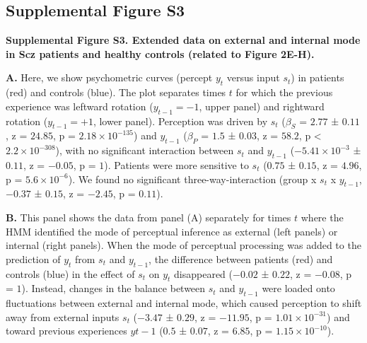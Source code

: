 \documentclass[
]{article}
\begin{document}
\newpage

\hypertarget{supplemental-figure-s3}{%
\subsection{Supplemental Figure S3}\label{supplemental-figure-s3}}


\textbf{Supplemental Figure S3. Extended data on external and internal
mode in Scz patients and healthy controls (related to Figure 2E-H).}

\textbf{A.} Here, we show psychometric curves (percept \(y_t\) versus
input \(s_t\)) in patients (red) and controls (blue). The plot separates
times \(t\) for which the previous experience was leftward rotation
(\(y_{t-1} = -1\), upper panel) and rightward rotation
(\(y_{t-1} = +1\), lower panel). Perception was driven by \(s_t\)
(\(\beta_S\) = \(2.77\) ± \(0.11\), z = \(24.85\), p =
\(\ensuremath{2.18\times 10^{-135}}\)) and \(y_{t-1}\) (\(\beta_{P}\) =
\(1.5\) ± \(0.03\), z = \(58.2\), p < \(\ensuremath{2.2\times 10^{-308}}\)), with no significant
interaction between \(s_t\) and \(y_{t-1}\)
(\(\ensuremath{-5.41\times 10^{-3}}\) ± \(0.11\), z = \(-0.05\), p =
\(1\)). Patients were more sensitive to \(s_t\) (\(0.75\) ± \(0.15\), z
= \(4.96\), p = \(\ensuremath{5.6\times 10^{-6}}\)). We found no
significant three-way-interaction (group x \(s_t\) x \(y_{t-1}\),
\(-0.37\) ± \(0.15\), z = \(-2.45\), p = \(0.11\)).

\textbf{B.} This panel shows the data from panel (A) separately for
times \(t\) where the HMM identified the mode of perceptual inference as
external (left panels) or internal (right panels). When the mode of
perceptual processing was added to the prediction of \(y_t\) from
\(s_t\) and \(y_{t-1}\), the difference between patients (red) and
controls (blue) in the effect of \(s_t\) on \(y_t\) disappeared
(\(-0.02\) ± \(0.22\), z = \(-0.08\), p = \(1\)). Instead, changes in
the balance between \(s_t\) and \(y_{t-1}\) were loaded onto
fluctuations between external and internal mode, which caused perception
to shift away from external inputs \(s_t\) (\(-3.47\) ± \(0.29\), z =
\(-11.95\), p = \(\ensuremath{1.01\times 10^{-31}}\)) and toward
previous experiences \(y{t-1}\) (\(0.5\) ± \(0.07\), z = \(6.85\), p =
\(\ensuremath{1.15\times 10^{-10}}\)).
\end{document}
